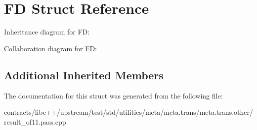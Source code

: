\hypertarget{struct_f_d}{}\section{FD Struct Reference}
\label{struct_f_d}


Inheritance diagram for FD\+:


Collaboration diagram for FD\+:
\subsection*{Additional Inherited Members}


The documentation for this struct was generated from the following file\+:\begin{DoxyCompactItemize}
\item 
contracts/libc++/upstream/test/std/utilities/meta/meta.\+trans/meta.\+trans.\+other/result\+\_\+of11.\+pass.\+cpp\end{DoxyCompactItemize}
